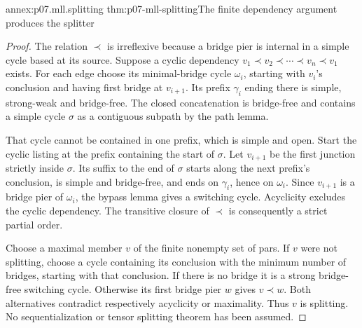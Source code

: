 \begin{annexitem}{annex:p07.mll.splitting}
 {thm:p07-mll-splitting}{The finite dependency argument produces the splitter}
\begin{proof}
The relation \(\prec\) is irreflexive because a bridge pier is internal
in a simple cycle based at its source. Suppose a cyclic dependency
\(v_1\prec v_2\prec\cdots\prec v_n\prec v_1\) exists.
For each edge choose its minimal-bridge cycle \(\omega_i\), starting
with \(v_i\)'s conclusion and having first bridge at \(v_{i+1}\).
Its prefix \(\gamma_i\) ending there is simple, strong-weak and bridge-free.
The closed concatenation is bridge-free and contains a simple cycle
\(\sigma\) as a contiguous subpath by the path lemma.

That cycle cannot be contained in one prefix, which is simple and open.
Start the cyclic listing at the prefix containing the start of \(\sigma\).
Let \(v_{i+1}\) be the first junction strictly inside \(\sigma\).
Its suffix to the end of \(\sigma\) starts along the next prefix's
conclusion, is simple and bridge-free, and ends on \(\gamma_i\),
hence on \(\omega_i\). Since \(v_{i+1}\) is a bridge pier of
\(\omega_i\), the bypass lemma gives a switching cycle.
Acyclicity excludes the cyclic dependency. The transitive closure
of \(\prec\) is consequently a strict partial order.

Choose a maximal member \(v\) of the finite nonempty set of pars.
If \(v\) were not splitting, choose a cycle containing its conclusion
with the minimum number of bridges, starting with that conclusion.
If there is no bridge it is a strong bridge-free switching cycle.
Otherwise its first bridge pier \(w\) gives \(v\prec w\).
Both alternatives contradict respectively acyclicity or maximality.
Thus \(v\) is splitting. No sequentialization or tensor splitting
theorem has been assumed.
\end{proof}
\end{annexitem}

